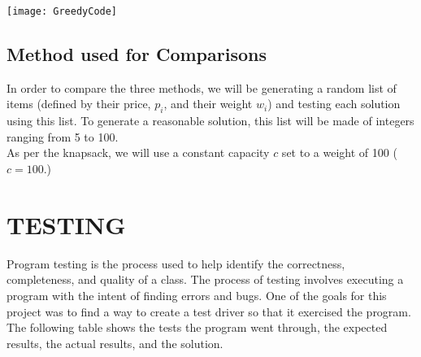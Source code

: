\documentclass[12pt]{article}
\begin{document}
\texttt{[image: GreedyCode]}
\subsection*{Method used for Comparisons}

In order to compare the three methods, we will be generating a random list of items (defined by their price, $p_i$, and their weight $w_i$) and testing each solution using this list. To generate a reasonable solution, this list will be made of integers ranging from 5 to 100.\\

As per the knapsack, we will use a constant capacity $c$ set to a weight of 100 ($c=100$.)


\newpage
\section*{TESTING} 
	
	
	Program testing is the process used to help identify the correctness, completeness, and quality of a class. The process of testing involves executing a program with the intent of finding errors and bugs. One of the goals for this project was to find a way to create a test driver so that it exercised the program. The following table shows the tests the program went through, the expected results, the actual results, and the solution. \\
	
\end{document}

